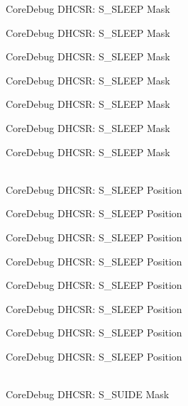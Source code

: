 \begin{DoxyRefList}
\label{deprecated__deprecated000116}%
%
Core\+Debug DHCSR:\+ S\+\_\+\+SLEEP Mask 

\label{deprecated__deprecated000170}%
%
Core\+Debug DHCSR:\+ S\+\_\+\+SLEEP Mask 

\label{deprecated__deprecated000255}%
%
Core\+Debug DHCSR:\+ S\+\_\+\+SLEEP Mask 

\label{deprecated__deprecated000312}%
%
Core\+Debug DHCSR:\+ S\+\_\+\+SLEEP Mask 

\label{deprecated__deprecated000388}%
%
Core\+Debug DHCSR:\+ S\+\_\+\+SLEEP Mask 

\label{deprecated__deprecated000475}%
%
Core\+Debug DHCSR:\+ S\+\_\+\+SLEEP Mask 

\label{deprecated__deprecated000577}%
%
Core\+Debug DHCSR:\+ S\+\_\+\+SLEEP Mask  
\item[{\parbox[t]{\linewidth}{Global \doxylink{group__CMSIS__CoreDebug_ga349ccea33accc705595624c2d334fbcb}{Core\+Debug\+\_\+\+DHCSR\+\_\+\+S\+\_\+\+SLEEP\+\_\+\+Pos} }}]\hfill \\
\label{deprecated__deprecated000023}%
%
Core\+Debug DHCSR:\+ S\+\_\+\+SLEEP Position 

\label{deprecated__deprecated000115}%
%
Core\+Debug DHCSR:\+ S\+\_\+\+SLEEP Position 

\label{deprecated__deprecated000169}%
%
Core\+Debug DHCSR:\+ S\+\_\+\+SLEEP Position 

\label{deprecated__deprecated000254}%
%
Core\+Debug DHCSR:\+ S\+\_\+\+SLEEP Position 

\label{deprecated__deprecated000311}%
%
Core\+Debug DHCSR:\+ S\+\_\+\+SLEEP Position 

\label{deprecated__deprecated000387}%
%
Core\+Debug DHCSR:\+ S\+\_\+\+SLEEP Position 

\label{deprecated__deprecated000474}%
%
Core\+Debug DHCSR:\+ S\+\_\+\+SLEEP Position 

\label{deprecated__deprecated000576}%
%
Core\+Debug DHCSR:\+ S\+\_\+\+SLEEP Position  
\item[{\parbox[t]{\linewidth}{Global \doxylink{group__CMSIS__SCB_gad37656791dbb216ffb194995f28c412c}{Core\+Debug\+\_\+\+DHCSR\+\_\+\+S\+\_\+\+SUIDE\+\_\+\+Msk} }}]\hfill \\
\label{deprecated__deprecated000016}%
%
Core\+Debug DHCSR:\+ S\+\_\+\+SUIDE Mask 


\end{DoxyRefList}

